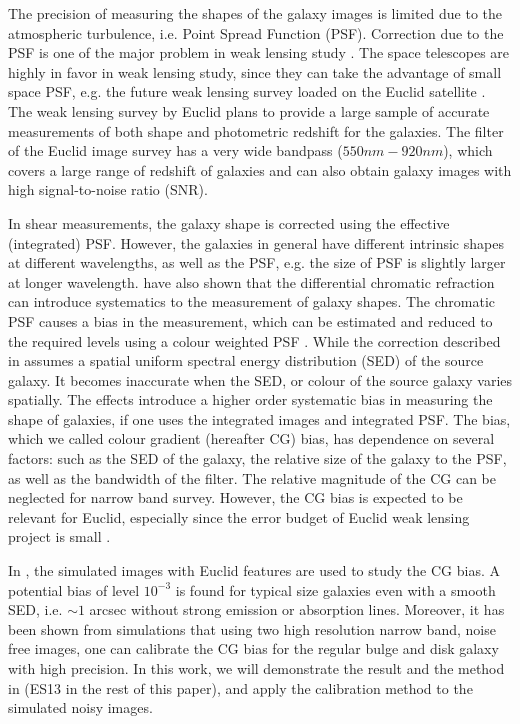 \documentclass[useAMS,usenatbib]{mn2e}
\begin{document}
The precision of measuring the shapes of the galaxy images is limited
due to the atmospheric turbulence, i.e. Point Spread Function
(PSF). Correction due to the PSF is one of the major problem in weak
lensing study \citep[e.g.][]{2012MNRAS.423.3163K}.  The space
telescopes are highly in favor in weak lensing study, since they can
take the advantage of small space PSF, e.g. the future weak lensing
survey loaded on the Euclid satellite \citep{2011arXiv1110.3193L}. The
weak lensing survey by Euclid plans to provide a large sample of
accurate measurements of both shape and photometric redshift for the
galaxies. The filter of the Euclid image survey has a very wide
bandpass ($550nm-920nm$), which covers a large range of redshift of
galaxies and can also obtain galaxy images with high signal-to-noise
ratio (SNR).

In shear measurements, the galaxy shape is corrected using the
effective (integrated) PSF. However, the galaxies in general have
different intrinsic shapes at different wavelengths, as well as the
PSF, e.g. the size of PSF is slightly larger at longer wavelength.
\citep{2015ApJ...807..182M} have also shown that the differential
chromatic refraction can introduce systematics to the measurement of
galaxy shapes. The chromatic PSF causes a bias in the measurement,
which can be estimated and reduced to the required levels using a
colour weighted PSF \citep{2010MNRAS.405..494C}. While the correction
described in \citet{2010MNRAS.405..494C} assumes a spatial uniform spectral
energy distribution (SED) of the source galaxy. It becomes inaccurate
when the SED, or colour of the source galaxy varies spatially. The
effects introduce a higher order systematic bias in measuring the
shape of galaxies, if one uses the integrated images and integrated
PSF. The bias, which we called colour gradient (hereafter CG) bias,
has dependence on several factors: such as the SED of the galaxy, the
relative size of the galaxy to the PSF, as well as the bandwidth of
the filter. The relative magnitude of the CG can be neglected for
narrow band survey. However, the CG bias is expected to be relevant
for Euclid, especially since the error budget of Euclid weak lensing project
is small \citep[e.g.][]{2013MNRAS.431.3103C,2013MNRAS.429..661M}.

In \citep{2012MNRAS.421.1385V, 2013MNRAS.432.2385S}, the simulated
images with Euclid features are used to study the CG bias. A potential
bias of level $10^{-3}$ is found for typical size galaxies even with a
smooth SED, i.e. $\sim1$ arcsec without strong emission or absorption
lines. Moreover, it has been shown from simulations that using two
high resolution narrow band, noise free images, one can calibrate the
CG bias for the regular bulge and disk galaxy with high precision.  In
this work, we will demonstrate the result and the method in
\citet{2013MNRAS.432.2385S}(ES13 in the rest of this paper), and apply
the calibration method to the simulated noisy images.
\end{document}
